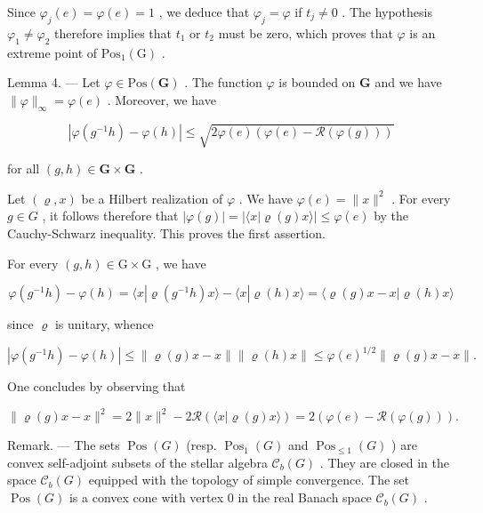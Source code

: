 Since \(\varphi_{j}(e) = \varphi(e) = 1\) , we deduce that \(\varphi_{j} = \varphi\) if \(t_{j} \neq 0\) . The hypothesis \(\varphi_{1} \neq \varphi_{2}\) therefore implies that \(t_{1}\) or \(t_{2}\) must be zero, which proves that \(\varphi\) is an extreme point of \(\mathrm{Pos}_{1}(\mathrm{G})\) .

Lemma 4. --- Let \(\varphi\in\mathrm{Pos}(\mathbf{G})\) . The function \(\varphi\) is bounded on \(\mathbf{G}\) and we have \(\|\varphi\|_{\infty}=\varphi(e)\) . Moreover, we have

\[
| \varphi (g ^ {- 1} h) - \varphi (h) | \leqslant \sqrt {2 \varphi (e) (\varphi (e) - \mathcal {R} (\varphi (g)))}\tag{1}
\]

for all \((g,h)\in \mathbf{G}\times \mathbf{G}\) .

Let \((\varrho, x)\) be a Hilbert realization of \(\varphi\) . We have \(\varphi(e) = \|x\|^2\) . For every \(g \in G\) , it follows therefore that \(|\varphi(g)| = |\langle x | \varrho(g)x\rangle| \leqslant \varphi(e)\) by the Cauchy-Schwarz inequality. This proves the first assertion.

For every \((g,h)\in \mathrm{G}\times \mathrm{G}\) , we have

\[
\varphi (g ^ {- 1} h) - \varphi (h) = \langle x | \varrho (g ^ {- 1} h) x \rangle - \langle x | \varrho (h) x \rangle = \langle \varrho (g) x - x | \varrho (h) x \rangle
\]

since \(\varrho\) is unitary, whence

\[
| \varphi (g ^ {- 1} h) - \varphi (h) | \leqslant \| \varrho (g) x - x \| \| \varrho (h) x \| \leqslant \varphi (e) ^ {1 / 2} \| \varrho (g) x - x \|.
\]

One concludes by observing that

\[
\| \varrho (g) x - x \| ^ {2} = 2 \| x \| ^ {2} - 2 \mathcal {R} (\langle x | \varrho (g) x \rangle) = 2 (\varphi (e) - \mathcal {R} (\varphi (g))).
\]

Remark. --- The sets \(\operatorname{Pos}(G)\) (resp. \(\operatorname{Pos}_{1}(G)\) and \(\operatorname{Pos}_{\leqslant1}(G)\) ) are convex self-adjoint subsets of the stellar algebra \(\mathcal{C}_{b}(G)\) . They are closed in the space \(\mathcal{C}_{b}(G)\) equipped with the topology of simple convergence. The set \(\operatorname{Pos}(G)\) is a convex cone with vertex 0 in the real Banach space \(\mathcal{C}_{b}(G)\) .


